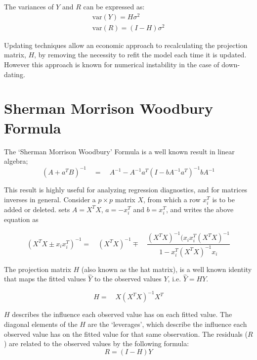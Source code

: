 \documentclass[12pt, a4paper]{article}
\begin{document}
The variances of $Y$ and $R$ can be expressed as:
\begin{eqnarray}
\mbox{var}(Y) = H\sigma^{2} \nonumber\\
\mbox{var}(R) = (I-H)\sigma^{2}
\end{eqnarray}

Updating techniques allow an economic approach to recalculating
the projection matrix, $H$, by removing the necessity to refit the
model each time it is updated. However this approach is known for
numerical instability in the case of down-dating.

\section{Sherman Morrison Woodbury Formula} %

The `Sherman Morrison Woodbury' Formula is a well known result in
linear algebra;
\begin{equation}
(A+a^{T}B)^{-1} \quad = \quad A^{-1}-
A^{-1}a^{T}(I-bA^{-1}a^{T})^{-1}bA^{-1}
\end{equation}

This result is highly useful for analyzing regression diagnostics,
and for matrices inverses in general. Consider a $p \times p$
matrix $X$, from which a row $x_{i}^{T}$ is to be added or
deleted. \citet{CookWeisberg} sets $A = X^{T}X$, $a=-x_{i}^{T}$
and $b=x_{i}^{T}$, and writes the above equation as

\begin{equation}
(X^{T}X \pm x_{i}x_{i}^{T})^{-1} = \quad(X^{T}X )^{-1} \mp \quad
\frac{(X^{T}X)^{-1}(x_{i}x_{i}^{T}(X^{T}X)^{-1}}{1-x_{i}^{T}(X^{T}X)^{-1}x_{i}}
\end{equation}

The projection matrix $H$ (also known as the hat matrix), is a
well known identity that maps the fitted values $\hat{Y}$ to the
observed values $Y$, i.e. $\hat{Y} = HY$.

\begin{equation}
H =\quad X(X^{T}X)^{-1}X^{T}
\end{equation}

$H$ describes the influence each observed value has on each fitted value. The diagonal elements of the $H$ are the `leverages', which describe the influence each observed value has on the fitted value for that same observation. The residuals ($R$) are related to the observed values by the following formula:
\begin{equation}
R = (I-H)Y
\end{equation}
\end{document}
